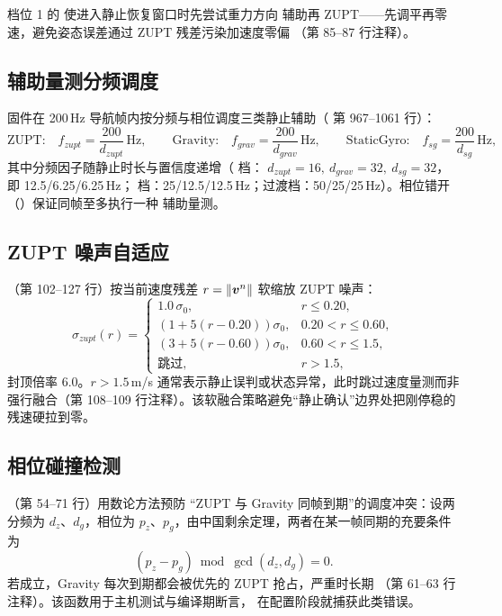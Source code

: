 档位 1 的  使进入静止恢复窗口时先尝试重力方向
辅助再 ZUPT——先调平再零速，避免姿态误差通过 ZUPT 残差污染加速度零偏
（第 85--87 行注释）。

\subsection{辅助量测分频调度}

固件在 200\,Hz 导航帧内按分频与相位调度三类静止辅助（
第 967--1061 行）：
\begin{equation}
  \text{ZUPT:}\quad f_{zupt} = \frac{200}{d_{zupt}}\,\text{Hz}, \qquad
  \text{Gravity:}\quad f_{grav} = \frac{200}{d_{grav}}\,\text{Hz}, \qquad
  \text{StaticGyro:}\quad f_{sg} = \frac{200}{d_{sg}}\,\text{Hz},
  \label{eq:aid-freq}
\end{equation}
其中分频因子随静止时长与置信度递增（ 档：
$d_{zupt}=16,\ d_{grav}=32,\ d_{sg}=32$，即 12.5/6.25/6.25\,Hz；
档：25/12.5/12.5\,Hz；过渡档：50/25/25\,Hz）。相位错开
（）保证同帧至多执行一种
辅助量测。

\subsection{ZUPT 噪声自适应}

（第 102--127 行）按当前速度残差
$r = \|\boldsymbol{v}^n\|$ 软缩放 ZUPT 噪声：
\begin{equation}
  \sigma_{zupt}(r) = \begin{cases}
    1.0\,\sigma_0, & r \le 0.20, \\
    \left(1 + 5(r - 0.20)\right)\sigma_0, & 0.20 < r \le 0.60, \\
    \left(3 + 5(r - 0.60)\right)\sigma_0, & 0.60 < r \le 1.5, \\
    \text{跳过}, & r > 1.5,
  \end{cases}
  \label{eq:zupt-adaptive}
\end{equation}
封顶倍率 6.0。$r > 1.5$\,m/s 通常表示静止误判或状态异常，此时跳过速度量测而非
强行融合（第 108--109 行注释）。该软融合策略避免``静止确认''边界处把刚停稳的
残速硬拉到零。

\subsection{相位碰撞检测}

（第 54--71 行）用数论方法预防
``ZUPT 与 Gravity 同帧到期''的调度冲突：设两分频为 $d_z$、$d_g$，相位为
$p_z$、$p_g$，由中国剩余定理，两者在某一帧同期的充要条件为
\begin{equation}
  (p_z - p_g) \bmod \gcd(d_z, d_g) = 0.
  \label{eq:phase-collision}
\end{equation}
若成立，Gravity 每次到期都会被优先的 ZUPT 抢占，严重时长期
（第 61--63 行注释）。该函数用于主机测试与编译期断言，
在配置阶段就捕获此类错误。

